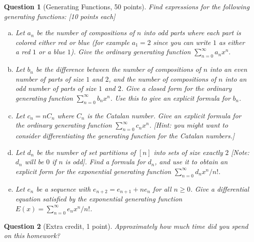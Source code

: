 \documentclass{article}
\newtheorem{ques}{Question}
\begin{document}
\begin{ques}[Generating Functions, 50 points]
Find expressions for the following generating functions: [10 points each]
\begin{enumerate}[(a)]
\item Let $a_n$ be the number of compositions of $n$ into odd parts where each part is colored either red or blue (for example $a_1=2$ since you can write $1$ as either a red $1$ or a blue $1$). Give the ordinary generating function $\sum_{n=0}^\infty a_n x^n.$
\item Let $b_n$ be the difference between the number of compositions of $n$ into an even number of parts of size $1$ and $2$, and the number of compositions of $n$ into an odd number of parts of size $1$ and $2$. Give a closed form for the ordinary generating function $\sum_{n=0}^\infty b_nx^n$. Use this to give an explicit formula for $b_n$.
\item Let $c_n = n C_n$ where $C_n$ is the Catalan number. Give an explicit formula for the ordinary generating function $\sum_{n=0}^\infty c_n x^n$. [Hint: you might want to consider differentiating the generating function for the Catalan numbers.]
\item Let $d_n$ be the number of set partitions of $[n]$ into sets of size exactly $2$ [Note: $d_n$ will be $0$ if $n$ is odd]. Find a formula for $d_n$, and use it to obtain an explicit form for the exponential generating function $\sum_{n=0}^\infty d_n x^n/n!$.
\item Let $e_n$ be a sequence with $e_{n+2} = e_{n+1}+ne_n$ for all $n\geq 0$. Give a differential equation satisfied by the exponential generating function $E(x) = \sum_{n=0}^\infty e_n x^n/n!$.
\end{enumerate}
\end{ques}

\begin{ques}[Extra credit, 1 point]
Approximately how much time did you spend on this homework?
\end{ques}
\end{document}
